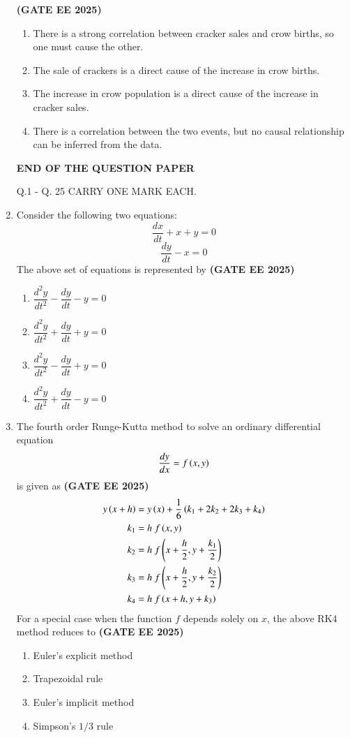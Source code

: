 \documentclass[journal,12pt,onecolumn]{IEEEtran}
\theoremstyle{remark}
\begin{document}
\begin{enumerate}
\hfill \textbf{(GATE EE 2025)} \begin{enumerate}
    \item There is a strong correlation between cracker sales and crow births, so one must cause the other.
    \item The sale of crackers is a direct cause of the increase in crow births.
    \item The increase in crow population is a direct cause of the increase in cracker sales.
    \item There is a correlation between the two events, but no causal relationship can be inferred from the data.
\end{enumerate}


\begin{center}
\textbf{END OF THE QUESTION PAPER}
\end{center}
\newpage
 


{Q.1 - Q. 25 CARRY ONE MARK EACH.}

\item Consider the following two equations:
\[ \frac{dx}{dt}+x+y=0 \]
\[ \frac{dy}{dt}-x=0 \]
\normalsize The above set of equations is represented by
\hfill \textbf{(GATE EE 2025)} \begin{enumerate}
    \item $\dfrac{d^{2}y}{dt^{2}}-\dfrac{dy}{dt}-y=0$
    \item $\dfrac{d^{2}y}{dt^{2}}+\dfrac{dy}{dt}+y=0$
    \item $\dfrac{d^{2}y}{dt^{2}}-\dfrac{dy}{dt}+y=0$
    \item $\dfrac{d^{2}y}{dt^{2}}+\dfrac{dy}{dt}-y=0$
\end{enumerate}


\item The fourth order Runge-Kutta  method to solve an ordinary differential equation
\[ \frac{dy}{dx}=f\left(x,y\right) \]
is given as \hfill \textbf{(GATE EE 2025)}
\begin{align*}
y\left(x+h\right)&=y\left(x\right)+\frac{1}{6}\left(k_{1}+2k_{2}+2k_{3}+k_{4}\right) \\
k_{1}&=h~f\left(x,y\right) \\
k_{2}&=h~f\left(x+\frac{h}{2},y+\frac{k_{1}}{2}\right) \\
k_{3}&=h~f\left(x+\frac{h}{2},y+\frac{k_{2}}{2}\right) \\
k_{4}&=h~f\left(x+h,y+k_{3}\right)
\end{align*}
For a special case when the function $f$ depends solely on $x$, the above RK4 method reduces to
\hfill \textbf{(GATE EE 2025)} \begin{enumerate}
    \item Euler's explicit method
    \item Trapezoidal rule
    \item Euler's implicit method
    \item Simpson's $1/3$ rule
\end{enumerate}




\end{enumerate}
\end{document}
